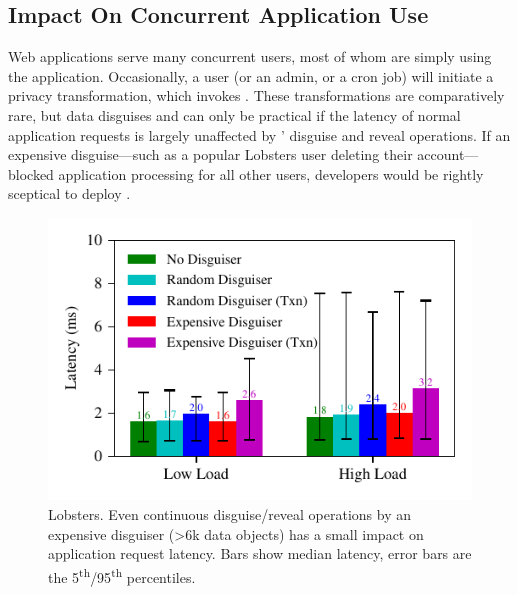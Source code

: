 \subsection{Impact On Concurrent Application Use}
\label{s:eval-conc}

%
Web applications serve many concurrent users, most of whom are simply using the
application.
%
Occasionally, a user (or an admin, or a cron job) will initiate a privacy
transformation, which invokes \sys.
%
These transformations are comparatively rare, but data disguises and \sys can
only be practical if the latency of normal application requests is largely
unaffected by \sys' disguise and reveal operations.
%
If an expensive disguise---such as a popular Lobsters user deleting their
account---blocked application processing for all other users, developers would
be rightly sceptical to deploy \sys.
%

\begin{figure}[t]
    \centering
        \includegraphics{figs/lobsters_concurrent_results}
        \caption{Lobsters. Even continuous disguise/reveal operations by an expensive disguiser (>6k
          data objects) has a small impact on application request latency. Bars show median latency,
          error bars are the 5\textsuperscript{th}/95\textsuperscript{th} percentiles.}
        \label{f:concurrent-lobsters}
\end{figure}

